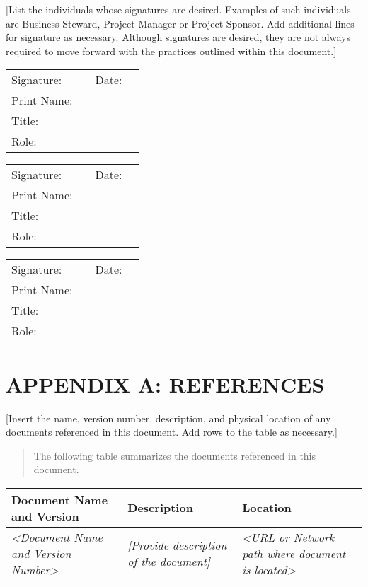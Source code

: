 \documentclass[a4paper, 11pt]{article}
\newcommand{\ra}[1]{\renewcommand{\arraystretch}{#1}}
\begin{document}
{[}List the individuals whose signatures are desired. Examples of such
individuals are Business Steward, Project Manager or Project Sponsor.
Add additional lines for signature as necessary. Although signatures are
desired, they are not always required to move forward with the practices
outlined within this document.{]}

\ra{2.0}
\begin{longtable}[]{@{}llll@{}}
  Signature: & \hspace{100pt} & Date: & \hspace*{100pt}\tabularnewline
  Print Name: & & &\tabularnewline
  Title: & & &\tabularnewline
  Role: & & &\tabularnewline
\end{longtable}

\begin{longtable}[]{@{}llll@{}}
  Signature: & \hspace{100pt} & Date: & \hspace*{100pt}\tabularnewline
  Print Name: & & &\tabularnewline
  Title: & & &\tabularnewline
  Role: & & &\tabularnewline
\end{longtable}

\begin{longtable}[]{@{}llll@{}}
  Signature: & \hspace{100pt} & Date: & \hspace*{100pt}\tabularnewline
  Print Name: & & &\tabularnewline
  Title: & & &\tabularnewline
  Role: & & &\tabularnewline
\end{longtable}

\newpage


\section{APPENDIX A: REFERENCES}

{[}Insert the name, version number, description, and physical location
of any documents referenced in this document. Add rows to the table as
necessary.{]}

\begin{quote}
The following table summarizes the documents referenced in this
document.
\end{quote}

\ra{1.3}
\begin{longtable}[]{@{}lll@{}}
  \toprule
  \textbf{Document Name and Version} & \textbf{Description} &
  \textbf{Location}\tabularnewline
  \midrule
  \endhead
  \emph{\textless{}Document Name and Version Number\textgreater{}} &
  \emph{{[}Provide description of the document{]}} & \emph{\textless{}URL
  or Network path where document is located\textgreater{}}\tabularnewline
  \bottomrule
\end{longtable}
\end{document}
